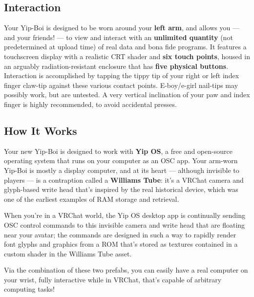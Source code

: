 \documentclass[10pt]{article}
\begin{document}
\subsection{Interaction}

Your Yip-Boi is designed to be worn around your \textbf{left arm}, and allows you --- and your friends! --- to view and interact with an \textbf{unlimited quantity} (not predetermined at upload time) of real data and bona fide programs. It features a touchscreen display with a realistic CRT shader and \textbf{six touch points}, housed in an arguably radiation-resistant enclosure that has \textbf{five physical buttons}. Interaction is accomplished by tapping the tippy tip of your right or left index finger claw-tip against these various contact points. E-boy/e-girl nail-tips may possibly work, but are untested. A very vertical inclination of your paw and index finger is highly recommended, to avoid accidental presses.

\subsection{How It Works}

Your new Yip-Boi is designed to work with \textbf{Yip OS}, a free and open-source operating system that runs on your computer as an OSC app. Your arm-worn Yip-Boi is mostly a display computer, and at its heart --- although invisible to players --- is a contraption called a \textbf{Williams Tube}: it's a VRChat camera and glyph-based write head that's inspired by the real historical device, which was one of the earliest examples of RAM storage and retrieval.

When you're in a VRChat world, the Yip OS desktop app is continually sending OSC control commands to this invisible camera and write head that are floating near your avatar; the commands are designed in such a way to rapidly render font glyphs and graphics from a ROM that's stored as textures contained in a custom shader in the Williams Tube asset.

Via the combination of these two prefabs, you can easily have a real computer on your wrist, fully interactive while in VRChat, that's capable of arbitrary computing tasks!





\newpage
\end{document}
